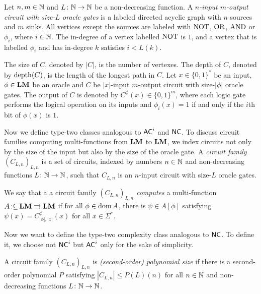 \documentclass[envcountsame,orivec,oribibl]{llncs}
\newcommand{\pcolon}{\mathpunct{\,:\subseteq}}
\begin{document}
\begin{definition}
Let $n, m \in \mathbb N$ and $L \colon \mathbb N \to \mathbb N$ be a non-decreasing function.
A \emph{$n$-input $m$-output circuit with size-$L$ oracle gates} is 
a labeled directed acyclic graph with $n$ sources and $m$ sinks.
All vertices except the sources are labeled with $\mathrm{NOT}$, $\mathrm{OR}$, $\mathrm{AND}$ 
or $\phi _i$, where $i \in \mathbb N$.
The in-degree of a vertex labelled $\mathrm{NOT}$ is $1$, and
a vertex that is labelled $\phi _i$ and has in-degree $k$ 
satisfies $i < L(k)$.

The size of $C$, denoted by $|C|$, is the number of vertexes.
The depth of $C$, denoted by $\mathop{\rm depth}(C)$, is the length of the longest path in $C$.
Let $x \in \{0, 1\}^*$ be an input, $\phi \in \mathbf{LM}$ be an oracle and
$C$ be $|x|$-input $m$-output circuit with size-$|\phi|$ oracle gates.
The output of $C$ is denoted by $C^\phi(x) \in \{0, 1\}^m$,
where each logic gate performs the logical operation on its inputs
and $\phi_i(x) = 1$ if and only if the $i$th bit of $\phi(x)$ is $1$.
\end{definition}


Now we define type-two classes analogous to 
$\mathsf{AC}^i$ and $\mathsf{NC}$.
To discuss circuit families computing multi-functions from $\mathbf{LM}$ to $\mathbf{LM}$,
we index circuits not only by the size of the input but also by the size of the oracle gate.
A {\em circuit family $(C_{L,n})_{L,n}$} is a set of circuits, 
indexed by numbers $n \in \mathbb N$ and non-decreasing functions $L \colon \mathbb N \to \mathbb N$,
such that $C_{L, n}$ is an $n$-input circuit with size-$L$ oracle gates.


\begin{definition}
 We say that a a circuit family $(C_{L,n})_{L,n}$ 
\emph{computes} a multi-function 
 $A \pcolon \LM \rightrightarrows \LM$ if for all $\phi \in \mathop{\rm dom} A$, 
 there is $\psi \in A[\phi]$ satisfying $\psi(x) = C_{|\phi|, |x|}^\phi(x)$
 for all $x \in \Sigma^*$.
\end{definition}

Now we want to define the type-two complexity class analogous to $\mathsf{NC}$.
To define it, we choose not $\mathsf{NC}^i$ but $\mathsf{AC}^i$ 
only for the sake of simplicity.

A circuit family $(C_{L,n})_{L,n}$ is \emph{(second-order) polynomial size}
if there is a second-order polynomial $P$ satisfying
$|C_{L,n}| \le P(L)(n)$ for all $n \in \mathbb N$ and non-decreasing functions
$L \colon \mathbb N \to \mathbb N$.

\end{document}

